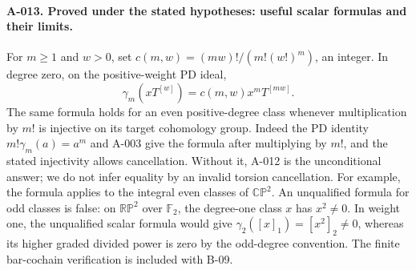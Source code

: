 \paragraph{A-013. Proved under the stated hypotheses: useful scalar
formulas and their limits.}
For $m\geq1$ and $w>0$, set
$c(m,w)=(mw)!/(m!(w!)^m)$, an integer. In degree zero, on the
positive-weight PD ideal,
\[
 \gamma_m(xT^{[w]})=c(m,w)x^mT^{[mw]}.
\]
The same formula holds for an even positive-degree class whenever
multiplication by $m!$ is injective on its target cohomology group.
Indeed the PD identity $m!\gamma_m(a)=a^m$ and A-003 give the
formula after multiplying by $m!$, and the stated injectivity allows
cancellation. Without it, A-012 is the unconditional answer; we do
not infer equality by an invalid torsion cancellation. For example,
the formula applies to the integral even classes of $\mathbb{CP}^2$.
An unqualified formula for odd classes is false: on
$\mathbb{RP}^2$ over $\mathbb F_2$, the degree-one class $x$ has
$x^2\ne0$. In weight one, the unqualified scalar formula would
give $\gamma_2([x]_1)=[x^2]_2\ne0$, whereas its higher graded
divided power is zero by the odd-degree convention.
The finite bar-cochain verification is included with B-09.

